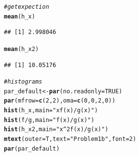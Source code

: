 \documentclass{article}\usepackage[]{graphicx}\usepackage[]{color}
\makeatletter
\newcommand{\hlnum}[1]{\textcolor[rgb]{0.686,0.059,0.569}{#1}}%
\newcommand{\hlstr}[1]{\textcolor[rgb]{0.192,0.494,0.8}{#1}}%
\newcommand{\hlcom}[1]{\textcolor[rgb]{0.678,0.584,0.686}{\textit{#1}}}%
\newcommand{\hlopt}[1]{\textcolor[rgb]{0,0,0}{#1}}%
\newcommand{\hlstd}[1]{\textcolor[rgb]{0.345,0.345,0.345}{#1}}%
\newcommand{\hlkwb}[1]{\textcolor[rgb]{0.69,0.353,0.396}{#1}}%
\newcommand{\hlkwc}[1]{\textcolor[rgb]{0.333,0.667,0.333}{#1}}%
\newcommand{\hlkwd}[1]{\textcolor[rgb]{0.737,0.353,0.396}{\textbf{#1}}}%
\newenvironment{kframe}{%
 \def\at@end@of@kframe{}%
 \ifinner\ifhmode%
  \def\at@end@of@kframe{\end{minipage}}%
  \begin{minipage}{\columnwidth}%
 \fi\fi%
 \def\FrameCommand##1{\hskip\@totalleftmargin \hskip-\fboxsep
 \colorbox{shadecolor}{##1}\hskip-\fboxsep
     \hskip-\linewidth \hskip-\@totalleftmargin \hskip\columnwidth}%
 \MakeFramed {\advance\hsize-\width
   \@totalleftmargin\z@ \linewidth\hsize
   \@setminipage}}%
 {\par\unskip\endMakeFramed%
 \at@end@of@kframe}
\newenvironment{knitrout}{}{} %
\makeatother
\begin{document}
\begin{knitrout}
\begin{kframe}
\begin{alltt}
\hlcom{#get expection}
\hlkwd{mean}\hlstd{(h_x)}
\end{alltt}
\begin{verbatim}
## [1] 2.998046
\end{verbatim}
\begin{alltt}
\hlkwd{mean}\hlstd{(h_x2)}
\end{alltt}
\begin{verbatim}
## [1] 10.05176
\end{verbatim}
\begin{alltt}
\hlcom{#histograms}
\hlstd{par_default} \hlkwb{<-} \hlkwd{par}\hlstd{(}\hlkwc{no.readonly} \hlstd{=} \hlnum{TRUE}\hlstd{)}
\hlkwd{par}\hlstd{(}\hlkwc{mfrow} \hlstd{=} \hlkwd{c}\hlstd{(}\hlnum{2}\hlstd{,} \hlnum{2}\hlstd{),} \hlkwc{oma} \hlstd{=} \hlkwd{c}\hlstd{(}\hlnum{0}\hlstd{,} \hlnum{0}\hlstd{,} \hlnum{2}\hlstd{,} \hlnum{0}\hlstd{))}
\hlkwd{hist}\hlstd{(h_x,} \hlkwc{main} \hlstd{=} \hlstr{"x f(x) / g(x)"}\hlstd{)}
\hlkwd{hist}\hlstd{(f} \hlopt{/} \hlstd{g,} \hlkwc{main} \hlstd{=} \hlstr{"f(x)/g(x)"}\hlstd{)}
\hlkwd{hist}\hlstd{(h_x2,} \hlkwc{main} \hlstd{=} \hlstr{"x^2 f(x) / g(x)"}\hlstd{)}
\hlkwd{mtext}\hlstd{(}\hlkwc{outer} \hlstd{= T,} \hlkwc{text} \hlstd{=} \hlstr{"Problem 1b"}\hlstd{,} \hlkwc{font} \hlstd{=} \hlnum{2}\hlstd{)}
\hlkwd{par}\hlstd{(par_default)}
\end{alltt}
\end{kframe}

\end{knitrout}
\end{document}
